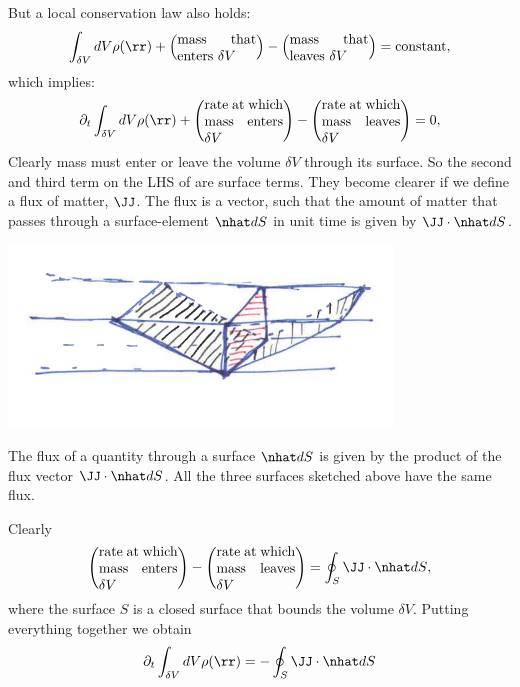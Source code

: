 But a local conservation law also holds:
\begin{equation}
\int_{\delta V} dV \rho(\rr) + 
\left(\parbox{2cm}{mass that enters $\delta V$}\right)- 
\left(\parbox{2cm}{mass that leaves $\delta V$}\right)
= \text{constant} \/,
\end{equation} 
which implies:
\begin{equation}
\partial_t\int_{\delta V} dV \rho(\rr) + 
\left(\parbox{2cm}{rate at which  mass enters $\delta V$}\right)
- \left(\parbox{2cm}{rate at which  mass leaves $\delta V$}\right) = 0 \/,
\label{A2.1:lmass}
\end{equation} 
Clearly mass must enter or leave the volume $\delta V$ through its
surface. So the second and third term on the LHS of 
are surface terms.  They become clearer if we define a flux of
matter, $\JJ$. The flux is a vector, such that the amount of matter
that passes through a surface-element $\nhat dS$ in unit time is given by
$\JJ\cdot\nhat dS$. 
\begin{marginfigure}
\includegraphics{figures/flux.png}
\caption{The flux of a quantity through a surface $\nhat dS$ is given by
the product of the flux vector $\JJ\cdot\nhat dS$. All the three
surfaces sketched above have the same flux. }
\label{fig:flux}
\end{marginfigure}
Clearly
\begin{equation}
\left(\parbox{2cm}{rate at which  mass enters $\delta V$}\right) - 
\left(\parbox{2cm}{rate at which  mass leaves $\delta V$}\right)
= \oint_{S}\JJ\cdot\nhat dS \/,
\end{equation}
where the surface $S$ is a closed surface that bounds the volume
$\delta V$. 
Putting everything together we obtain
\begin{equation}
\partial_t \int_{\delta V} dV \rho(\rr)  = - \oint_{S}\JJ\cdot\nhat dS
\end{equation}
